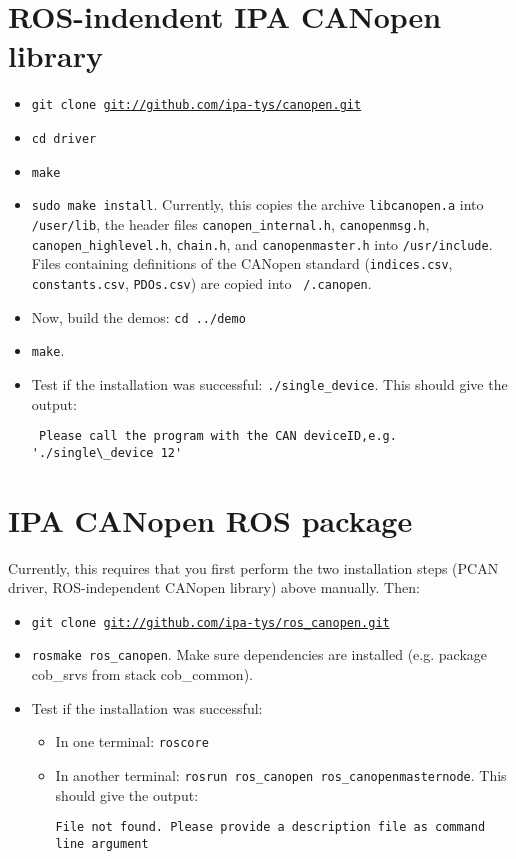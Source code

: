   \section{ROS-indendent IPA CANopen library}

  \begin{itemize}
    \item \texttt{git clone \url{git://github.com/ipa-tys/canopen.git}}
    \item \texttt{cd driver}
    \item \texttt{make}
    \item \texttt{sudo make install}. Currently, this copies the archive \texttt{libcanopen.a} into \texttt{/user/lib}, the header files \texttt{canopen\_internal.h}, \texttt{canopenmsg.h}, \texttt{canopen\_highlevel.h}, \texttt{chain.h}, and \texttt{canopenmaster.h} into \texttt{/usr/include}. Files containing definitions of the CANopen standard (\texttt{indices.csv}, \texttt{constants.csv}, \texttt{PDOs.csv}) are copied into \texttt{~/.canopen}.
    \item Now, build the demos: \texttt{cd ../demo}
      \item \texttt{make}.
    \item Test if the installation was successful: \texttt{./single\_device}. This should give the output:
      {\scriptsize
\begin{verbatim} Please call the program with the CAN deviceID,e.g. './single\_device 12'\end{verbatim}}
\end{itemize}

\section{IPA CANopen ROS package}

Currently, this requires that you first perform the two installation steps (PCAN driver, ROS-independent CANopen library) above manually. Then:

\begin{itemize}
\item \texttt{git clone \url{git://github.com/ipa-tys/ros_canopen.git}}
\item \texttt{rosmake ros\_canopen}. Make sure dependencies are installed (e.g. package cob\_srvs from stack cob\_common).
\item Test if the installation was successful:
\begin{itemize}
\item In one terminal: \texttt{roscore}
\item In another terminal: \texttt{rosrun ros\_canopen ros\_canopenmasternode}. This should give the output:
 {\scriptsize
\begin{verbatim}File not found. Please provide a description file as command line argument\end{verbatim}}
\end{itemize}


\end{itemize}


